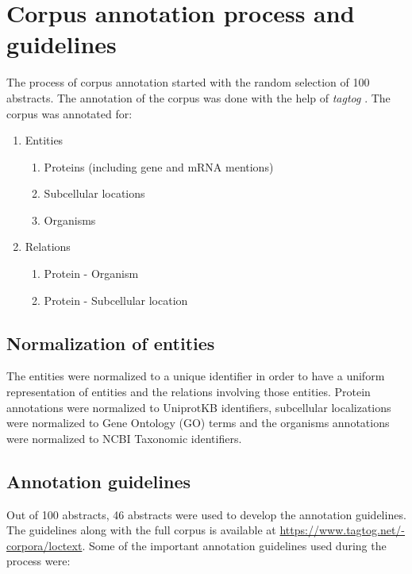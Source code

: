 \section{Corpus annotation process and guidelines}

The process of corpus annotation started with the random selection of 100 abstracts. The annotation of the corpus was done with the help of \textit{tagtog} \cite{cejuela2014tagtog}. The corpus was annotated for:

\begin{enumerate}
\item Entities
\begin{enumerate}
\item Proteins (including gene and mRNA mentions)
\item Subcellular locations
\item Organisms
\end{enumerate}
\item Relations
\begin{enumerate}
\item Protein - Organism
\item Protein - Subcellular location
\end{enumerate}
\end{enumerate}

\subsection*{Normalization of entities}

The entities were normalized to a unique identifier in order to have a uniform representation of entities and the relations involving those entities. Protein annotations were normalized to UniprotKB \cite{magrane2011uniprot} identifiers, subcellular localizations were normalized to Gene Ontology (GO) \cite{ashburner2000gene} terms and the organisms annotations were normalized to NCBI Taxonomic \cite{ncbiTaxonomy} identifiers.

\subsection*{Annotation guidelines}
Out of 100 abstracts, 46 abstracts were used to develop the annotation guidelines. The guidelines along with the full corpus is available at \url{https://www.tagtog.net/-corpora/loctext}. Some of the important annotation guidelines used during the process were:

